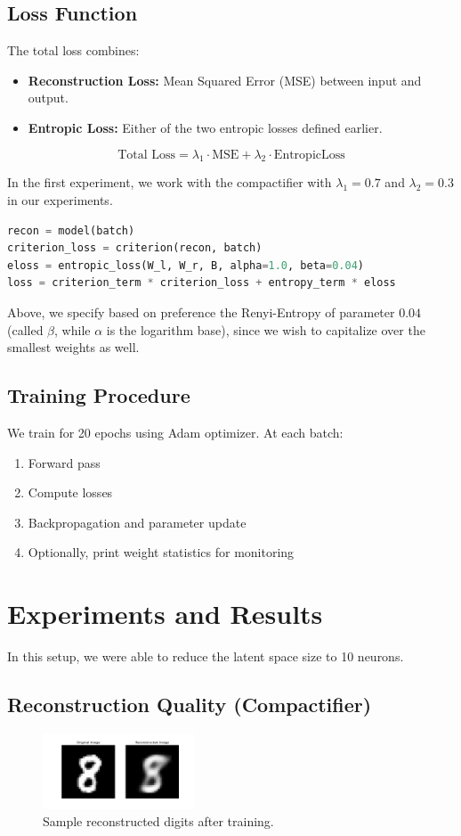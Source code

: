 \documentclass[12pt]{article}
\begin{document}
\subsection{Loss Function}
The total loss combines:
\begin{itemize}
    \item \textbf{Reconstruction Loss:} Mean Squared Error (MSE) between input and output.
    \item \textbf{Entropic Loss:} Either of the two entropic losses defined earlier.
\end{itemize}
\[
\text{Total Loss} = \lambda_1 \cdot \text{MSE} + \lambda_2 \cdot \text{EntropicLoss}
\]

In the first experiment, we work with the compactifier with $\lambda_1 = 0.7$ and $\lambda_2 = 0.3$ in our experiments.

\begin{lstlisting}[language=Python,caption={Loss Computation}]
recon = model(batch)
criterion_loss = criterion(recon, batch)
eloss = entropic_loss(W_l, W_r, B, alpha=1.0, beta=0.04)
loss = criterion_term * criterion_loss + entropy_term * eloss
\end{lstlisting}

Above, we specify based on preference the Renyi-Entropy of parameter \(0.04\) (called \(\beta\), while \(\alpha\) is the logarithm base), since we wish to capitalize over the smallest weights as well.

\subsection{Training Procedure}
We train for 20 epochs using Adam optimizer. At each batch:
\begin{enumerate}
    \item Forward pass
    \item Compute losses
    \item Backpropagation and parameter update
    \item Optionally, print weight statistics for monitoring
\end{enumerate}

\section{Experiments and Results}
In this setup, we were able to reduce the latent space size to 10 neurons. 

\subsection{Reconstruction Quality (Compactifier)}
\begin{figure}[ht]
    \centering
    \includegraphics[width=0.4\textwidth]{recon_example.png}
    \caption{Sample reconstructed digits after training.}
\end{figure}
\end{document}
